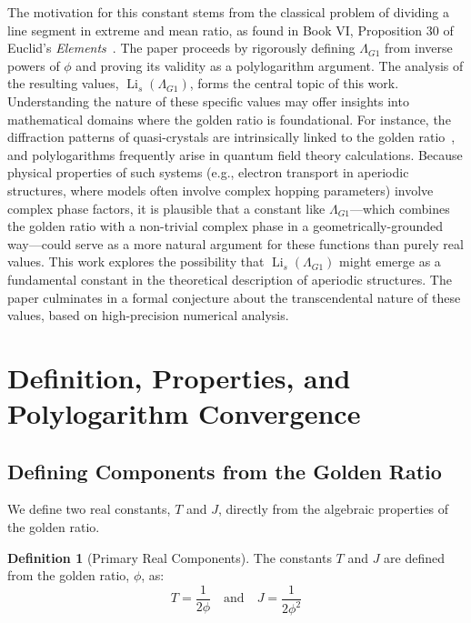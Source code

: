 \documentclass{amsart}
\theoremstyle{plain}
\theoremstyle{definition}
\newtheorem{definition}[theorem]{Definition}
\theoremstyle{remark}
\DeclareMathOperator{\Li}{Li}
\newcommand{\LambdaG}{\Lambda_{G1}}
\newcommand{\phiG}{\phi}
\begin{document}
The motivation for this constant stems from the classical problem of dividing a line segment in extreme and mean ratio, as found in Book VI, Proposition 30 of Euclid's \textit{Elements}~\cite{Euclid}. The paper proceeds by rigorously defining $\LambdaG$ from inverse powers of $\phiG$ and proving its validity as a polylogarithm argument. The analysis of the resulting values, $\Li_s(\LambdaG)$, forms the central topic of this work. Understanding the nature of these specific values may offer insights into mathematical domains where the golden ratio is foundational. For instance, the diffraction patterns of quasi-crystals are intrinsically linked to the golden ratio~\cite{Levine1984}, and polylogarithms frequently arise in quantum field theory calculations. Because physical properties of such systems (e.g., electron transport in aperiodic structures, where models often involve complex hopping parameters) involve complex phase factors, it is plausible that a constant like $\LambdaG$—which combines the golden ratio with a non-trivial complex phase in a geometrically-grounded way—could serve as a more natural argument for these functions than purely real values. This work explores the possibility that $\Li_s(\LambdaG)$ might emerge as a fundamental constant in the theoretical description of aperiodic structures. The paper culminates in a formal conjecture about the transcendental nature of these values, based on high-precision numerical analysis.

\section{Definition, Properties, and Polylogarithm Convergence}

\subsection{Defining Components from the Golden Ratio}
We define two real constants, $T$ and $J$, directly from the algebraic properties of the golden ratio.
\begin{definition}[Primary Real Components]
The constants $T$ and $J$ are defined from the golden ratio, $\phiG$, as:
\[ T = \frac{1}{2\phiG} \quad \text{and} \quad J = \frac{1}{2\phiG^2} \]
\end{definition}
\end{document}
